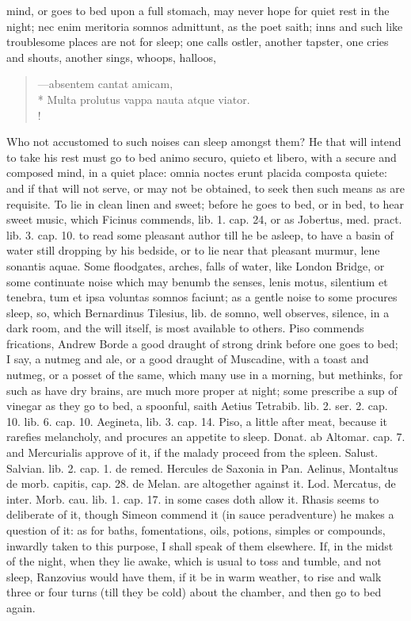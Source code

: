{mind, or goes to bed upon a full stomach, may never hope for
quiet rest in the night; nec enim meritoria somnos admittunt, as the
poet saith; inns and such like troublesome places are not for
sleep; one calls ostler, another tapster, one cries and shouts, another
sings, whoops, halloos,
%
%
\begin{latin}%
\begin{verse}%
---absentem cantat amicam,\\*
Multa prolutus vappa nauta atque viator.\\!
\end{verse}%
\end{latin}%
%
Who not accustomed to such noises can sleep amongst them? He that will
intend to take his rest must go to bed animo securo, quieto et libero,
with a secure and composed mind, in a quiet place: omnia noctes
erunt placida composta quiete: and if that will not serve, or may not
be obtained, to seek then such means as are requisite. To lie in clean
linen and sweet; before he goes to bed, or in bed, to hear sweet
music, which Ficinus commends, lib. 1. cap. 24, or as Jobertus, med.
pract. lib. 3. cap. 10. to read some pleasant author till he be
asleep, to have a basin of water still dropping by his bedside, or to
lie near that pleasant murmur, lene sonantis aquae. Some floodgates,
arches, falls of water, like London Bridge, or some continuate noise
which may benumb the senses, lenis motus, silentium et tenebra, tum et
ipsa voluntas somnos faciunt; as a gentle noise to some procures sleep,
so, which Bernardinus Tilesius, lib. de somno, well observes, silence,
in a dark room, and the will itself, is most available to others. Piso
commends frications, Andrew Borde a good draught of strong drink before
one goes to bed; I say, a nutmeg and ale, or a good draught of
Muscadine, with a toast and nutmeg, or a posset of the same, which many
use in a morning, but methinks, for such as have dry brains, are much
more proper at night; some prescribe a  sup of vinegar as they go
to bed, a spoonful, saith Aetius Tetrabib. lib. 2. ser. 2. cap. 10.
lib. 6. cap. 10. Aegineta, lib. 3. cap. 14. Piso, a little after meat,
because it rarefies melancholy, and procures an appetite to
sleep. Donat. ab Altomar. cap. 7. and Mercurialis approve of it, if the
malady proceed from the spleen. Salust. Salvian. lib. 2. cap. 1.
de remed. Hercules de Saxonia in Pan. Aelinus, Montaltus de morb.
capitis, cap. 28. de Melan. are altogether against it. Lod. Mercatus,
de inter. Morb. cau. lib. 1. cap. 17. in some cases doth allow it.
Rhasis seems to deliberate of it, though Simeon commend it (in
sauce peradventure) he makes a question of it: as for baths,
fomentations, oils, potions, simples or compounds, inwardly taken to
this purpose,  I shall speak of them elsewhere. If, in the midst
of the night, when they lie awake, which is usual to toss and tumble,
and not sleep,  Ranzovius would have them, if it be in warm
weather, to rise and walk three or four turns (till they be cold) about
the chamber, and then go to bed again.

}
